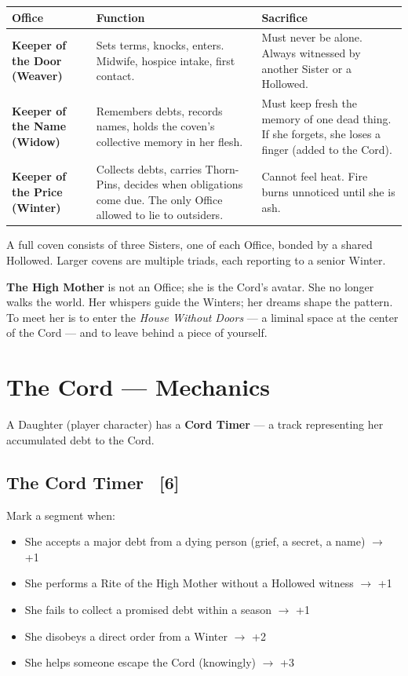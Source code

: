 \documentclass[10pt,twoside]{book}
\newcommand{\timer}[2]{\textsc{#1}~[#2]}
\begin{document}
\begin{table}[htbp]
\centering
\begin{tabular}{>{\bfseries}l p{} p{}}
\toprule
Office & Function & Sacrifice \\
\midrule
Keeper of the Door (Weaver) & Sets terms, knocks, enters. Midwife, hospice intake, first contact. & Must never be alone. Always witnessed by another Sister or a Hollowed. \\
Keeper of the Name (Widow) & Remembers debts, records names, holds the coven's collective memory in her flesh. & Must keep fresh the memory of one dead thing. If she forgets, she loses a finger (added to the Cord). \\
Keeper of the Price (Winter) & Collects debts, carries Thorn-Pins, decides when obligations come due. The only Office allowed to lie to outsiders. & Cannot feel heat. Fire burns unnoticed until she is ash. \\
\bottomrule
\end{tabular}
\end{table}

A full coven consists of three Sisters, one of each Office, bonded by a shared Hollowed. Larger covens are multiple triads, each reporting to a senior Winter.

\vspace{0.5cm}
\noindent\textbf{The High Mother} is not an Office; she is the Cord's avatar. She no longer walks the world. Her whispers guide the Winters; her dreams shape the pattern. To meet her is to enter the \textit{House Without Doors} --- a liminal space at the center of the Cord --- and to leave behind a piece of yourself.

\chapter{The Cord --- Mechanics}

A Daughter (player character) has a \textbf{Cord Timer} --- a track representing her accumulated debt to the Cord.

\section{The Cord Timer \timer{}{6}}

Mark a segment when:
\begin{itemize}
\item She accepts a major debt from a dying person (grief, a secret, a name) $\rightarrow$ +1
\item She performs a Rite of the High Mother without a Hollowed witness $\rightarrow$ +1
\item She fails to collect a promised debt within a season $\rightarrow$ +1
\item She disobeys a direct order from a Winter $\rightarrow$ +2
\item She helps someone escape the Cord (knowingly) $\rightarrow$ +3
\end{itemize}
\end{document}
